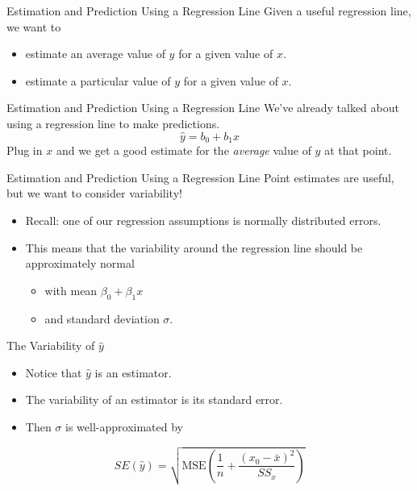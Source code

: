 \begin{frame}{Estimation and Prediction Using a Regression Line}
    Given a useful regression line, we want to 
    \begin{itemize}
        \item estimate an average value of $y$ for a given value of $x$.
        \item estimate a particular value of $y$ for a given value of $x$.
    \end{itemize}
\end{frame}

\begin{frame}{Estimation and Prediction Using a Regression Line}
    We've already talked about using a regression line to make predictions.
    \[
        \hat{y}=b_0 + b_1x
    \]
    Plug in $x$ and we get a good estimate for the \textit{average} value of $y$ at that point.
\end{frame}

\begin{frame}{Estimation and Prediction Using a Regression Line}
    Point estimates are useful, but we want to consider variability!
    \begin{itemize}
        \item Recall: one of our regression assumptions is normally distributed errors.
        \item This means that the variability around the regression line should be approximately normal 
        \begin{itemize}
            \item with mean $\beta_0 + \beta_1 x$
            \item and standard deviation $\sigma$.
        \end{itemize}
    \end{itemize}
\end{frame}

\begin{frame}{The Variability of $\hat{y}$}
    \begin{itemize}
        \item Notice that $\hat{y}$ is an estimator.
        \item The variability of an estimator is its standard error.
        \item Then $\sigma$ is well-approximated by 
    \end{itemize}
    \[
        SE(\hat{y}) = \sqrt{\text{MSE}\left(\frac{1}{n} + \frac{(x_0-\bar{x})^2}{SS_x}\right)}
    \]
\end{frame}

